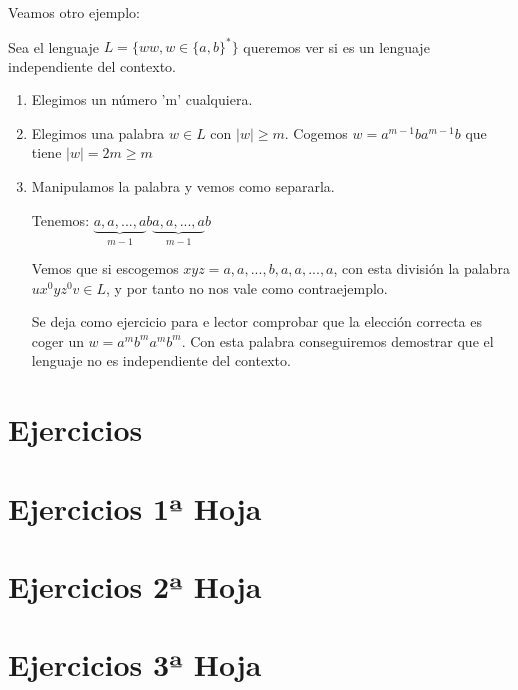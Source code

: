 \documentclass{apuntes}
\begin{document}
Veamos otro ejemplo:

\begin{example}
Sea el lenguaje $L=\{ww, w\in \{a,b\}^*\}$ queremos ver si es un lenguaje independiente del contexto.
\begin{enumerate}

\item Elegimos un número 'm' cualquiera.
\item Elegimos una palabra $w\in L$ con $|w| \geq m$. Cogemos $w=a^{m-1}ba^{m-1}b$ que tiene $|w|= 2m \geq m$
\item Manipulamos la palabra y vemos como separarla.

Tenemos: $\underbrace{a,a,...,a}_{m-1} b  \underbrace{a,a,...,a}_{m-1} b$

Vemos que si escogemos $xyz = a,a,...,b,a,a,...,a$, con esta división la palabra $ux^0yz^0v \in L$, y por tanto no nos vale como contraejemplo.

Se deja como ejercicio para e lector comprobar que la elección correcta es coger un $w=a^{m}b^ma^{m}b^m$. Con esta palabra conseguiremos demostrar que el lenguaje no es independiente del contexto.
\end{enumerate}
\end{example}
\appendix
\chapter{Ejercicios}


\chapter{Ejercicios 1ª Hoja}


\chapter{Ejercicios 2ª Hoja}


\chapter{Ejercicios 3ª Hoja}



\printindex
\end{document}
